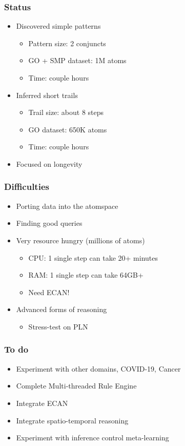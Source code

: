 \documentclass[aspectratio=169]{beamer}
\begin{document}
\begin{frame}
  \frametitle{Status}

  \begin{itemize}
  \item Discovered simple patterns
    \begin{itemize}
    \item Pattern size: 2 conjuncts
    \item GO + SMP dataset: 1M atoms
    \item Time: couple hours
    \end{itemize}
  \item Inferred short trails
    \begin{itemize}
    \item Trail size: about 8 steps
    \item GO dataset: 650K atoms
    \item Time: couple hours
    \end{itemize}
  \item Focused on longevity
  \end{itemize}
\end{frame}

\begin{frame}
  \frametitle{Difficulties}

  \begin{itemize}
  \item Porting data into the atomspace
  \item Finding good queries
  \item Very resource hungry (millions of atoms)\\
    \begin{itemize}
    \item CPU: 1 single step can take 20+ minutes
    \item RAM: 1 single step can take 64GB+
    \item Need ECAN!
    \end{itemize}
  \item Advanced forms of reasoning\\
    \begin{itemize}
    \item Stress-test on PLN
    \end{itemize}
  \end{itemize}
\end{frame}

\begin{frame}
  \frametitle{To do}

  \begin{itemize}
  \item Experiment with other domains, COVID-19, Cancer
  \item Complete Multi-threaded Rule Engine
  \item Integrate ECAN
  \item Integrate spatio-temporal reasoning
  \item Experiment with inference control meta-learning
  \end{itemize}
\end{frame}
\end{document}
